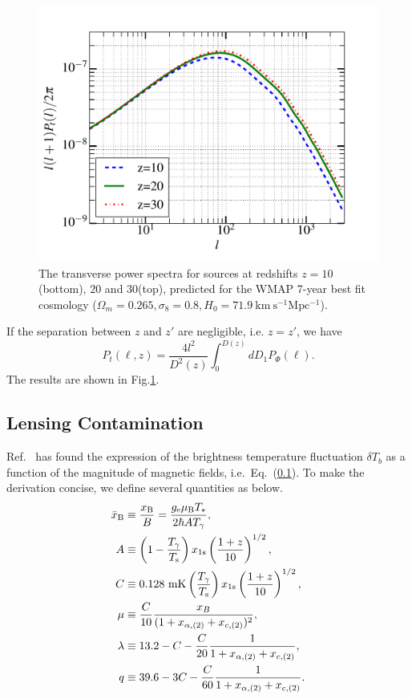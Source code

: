 \begin{figure}
\centering
\includegraphics[scale=0.45]{lensing_transverse.pdf}
\caption{The transverse power spectra for sources at redshifts $z=10$(bottom), $20$ and $30$(top), predicted for the WMAP 7-year best fit cosmology ($\Omega_m=0.265,\sigma_8=0.8,H_0=71.9\ \mathrm{km\ s^{-1}Mpc^{-1}}$).}
\label{Pt}
\end{figure}

If the separation between $z$ and $z'$ are negligible, i.e. $z=z'$, we have
\begin{equation}
P_t(\ell,z)=\frac{4l^2}{D^2(z)}\int_0^{D(z)}dD_1P_{\Phi}(\ell).
\end{equation}
The results are shown in Fig.\ref{Pt}.

\subsection{Lensing Contamination}
Ref.~\cite{Venumadhav:2014tqa} has found the expression of the brightness temperature fluctuation $\delta T_b$ as a function of the magnitude of magnetic fields, i.e.~Eq.~(\ref{}). To make the derivation concise, we define several quantities as below.
\begin{align}
\bar{x}_{\rm B}&\equiv\frac{x_{\rm B}}{B} = \frac{g_{\rm e} \mu_{\rm B} T_*}{2 \hbar A T_\gamma},\\
A&\equiv\left( 1 - \frac{T_\gamma}{T_{\rm s}} \right) x_{1{\rm s}} \left( \frac{1+z}{10} \right)^{1/2},\\
C&\equiv0.128 \ {\rm mK} \left( \frac{T_\gamma}{T_{\rm s}} \right) x_{1{\rm s}} \left( \frac{1+z}{10} \right)^{1/2},\\
\mu&\equiv\frac{C}{10}\frac{x_B}{(1+x_{\alpha,(2)}+x_{c,(2)})^2},\\
\lambda&\equiv 13.2-C-\frac{C}{20}\frac{1}{1+x_{\alpha,(2)}+x_{c,(2)}},\\
q&\equiv 39.6-3C-\frac{C}{60}\frac{1}{1+x_{\alpha,(2)}+x_{c,(2)}}.
\end{align}


